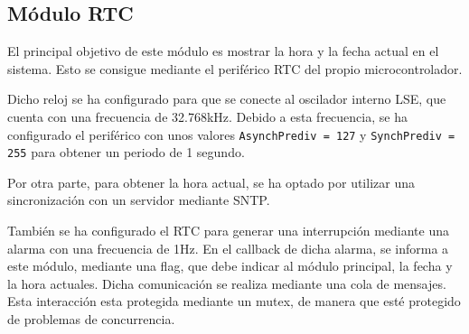 \subsection{Módulo RTC}
El principal objetivo de este módulo es mostrar la hora y la fecha actual en el sistema. Esto se consigue mediante el periférico RTC del propio microcontrolador.

Dicho reloj se ha configurado para que se conecte al oscilador interno LSE, que cuenta con una frecuencia de 32.768kHz. Debido a esta frecuencia, se ha configurado el periférico con unos valores \texttt{AsynchPrediv = 127} y \texttt{SynchPrediv = 255} para obtener un periodo de 1 segundo.

Por otra parte, para obtener la hora actual, se ha optado por utilizar una sincronización con un servidor mediante SNTP.

También se ha configurado el RTC para generar una interrupción mediante una alarma con una frecuencia de 1Hz. En el callback de dicha alarma, se informa a este módulo, mediante una flag, que debe indicar al módulo principal, la fecha y la hora actuales. Dicha comunicación se realiza mediante una cola de mensajes. Esta interacción esta protegida mediante un mutex, de manera que esté protegido de problemas de concurrencia.